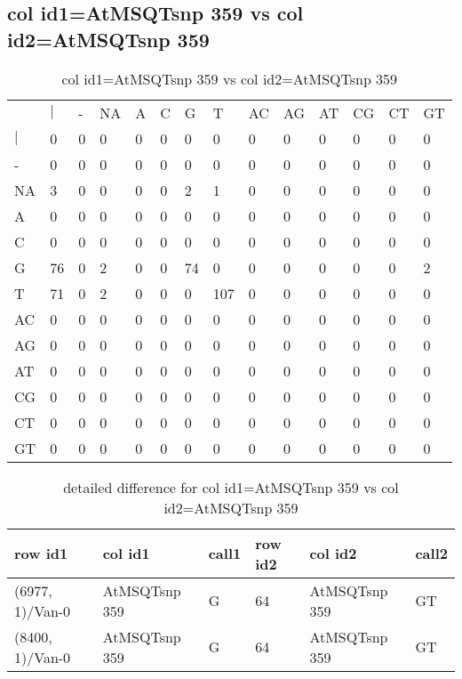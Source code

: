 \subsection{col id1=AtMSQTsnp 359 vs col id2=AtMSQTsnp 359}
\begin{center}
\begin{longtable}{|l|l|l|l|l|l|l|l|l|l|l|l|l|l|}
\caption{col id1=AtMSQTsnp 359 vs col id2=AtMSQTsnp 359} \label{table_dm874}\\
\hline
\\
\hline
&$|$&-&NA&A&C&G&T&AC&AG&AT&CG&CT&GT\\
$|$&0&0&0&0&0&0&0&0&0&0&0&0&0\\
-&0&0&0&0&0&0&0&0&0&0&0&0&0\\
NA&3&0&0&0&0&2&1&0&0&0&0&0&0\\
A&0&0&0&0&0&0&0&0&0&0&0&0&0\\
C&0&0&0&0&0&0&0&0&0&0&0&0&0\\
G&76&0&2&0&0&74&0&0&0&0&0&0&2\\
T&71&0&2&0&0&0&107&0&0&0&0&0&0\\
AC&0&0&0&0&0&0&0&0&0&0&0&0&0\\
AG&0&0&0&0&0&0&0&0&0&0&0&0&0\\
AT&0&0&0&0&0&0&0&0&0&0&0&0&0\\
CG&0&0&0&0&0&0&0&0&0&0&0&0&0\\
CT&0&0&0&0&0&0&0&0&0&0&0&0&0\\
GT&0&0&0&0&0&0&0&0&0&0&0&0&0\\
\hline
\end{longtable}
\end{center}

\begin{center}
\begin{longtable}{|l|l|l|l|l|l|}
\caption{detailed difference for col id1=AtMSQTsnp 359 vs col id2=AtMSQTsnp 359} \label{table_dm875}\\
\hline
row id1&col id1&call1&row id2&col id2&call2\\
\hline
(6977, 1)/Van-0&AtMSQTsnp 359&G&64&AtMSQTsnp 359&GT\\
(8400, 1)/Van-0&AtMSQTsnp 359&G&64&AtMSQTsnp 359&GT\\
\hline
\end{longtable}
\end{center}

